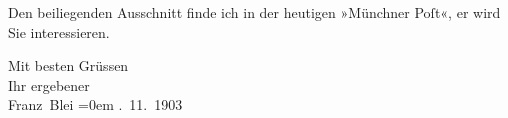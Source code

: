 \pstart
           Den beiliegenden Ausschnitt
               finde ich in der heutigen »Münchner Poſt«, er
               wird Sie interessieren.\pend
           
\pstart
           Mit besten Grüssen{\\[\baselineskip]}Ihr ergebener{\\[\baselineskip]}\spacefill\mbox{Franz Blei}\pend
           \leftskip=0em{}
. 11. 1903\pend
           \endnumbering{}  \newcommand{\dateiname}{L01346}\newcommand{\titel}{Franz Blei an Arthur Schnitzler, 25. 11. 1903}\newcommand{\editorInnen}{Martin Anton Müller und Gerd-Hermann Susen}
